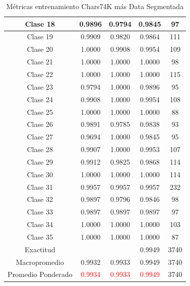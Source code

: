 \begin{table}[H]
\begin{center}
{\begin{tabular}{||c|c|c|c|c||}
Clase 18  &   0.9896 &   0.9794 &   0.9845  &   97\\\hline
Clase 19  &   0.9909 &   0.9820 &   0.9864  &   111\\\hline
Clase 20  &   1.0000 &   0.9908 &   0.9954  &   109\\\hline
Clase 21  &   1.0000 &   1.0000 &   1.0000  &   98\\\hline
Clase 22  &   1.0000 &   1.0000 &   1.0000  &   115\\\hline
Clase 23  &   0.9794 &  1.0000  &  0.9896   &   95\\\hline
Clase 24  &   0.9908 &   1.0000 &   0.9954  &   108\\\hline
Clase 25  &   1.0000 &   1.0000 &   1.0000  &   88\\\hline
Clase 26  &   0.9891 &   0.9785 &   0.9838  &   93\\\hline
Clase 27  &   0.9694 &   1.0000 &   0.9845  &   95\\\hline
Clase 28  &   0.9907 &   1.0000 &   0.9953  &   107\\\hline
Clase 29  &   0.9912 &   0.9825 &   0.9868  &   114\\\hline
Clase 30  &   1.0000 &   1.0000 &   1.0000  &   114\\\hline
Clase 31  &   0.9957 &   0.9957 &   0.9957  &   232\\\hline
Clase 32  &   0.9897 &   0.9796 &   0.9846  &   98\\\hline
Clase 33  &   0.9897 &   0.9897 &   0.9897  &   97\\\hline
Clase 34  &   1.0000 &   1.0000 &   1.0000  &   103\\\hline
Clase 35  &   1.0000 &   1.0000 &   1.0000  &   87\\\hline
\hline
Exactitud  &  &  & 0.9949  &   3740\\\hline
Macropromedio &   0.9932 &   0.9933 &   0.9949  &   3740\\\hline
Promedio Ponderado  & \textcolor{red}{0.9934} &   \textcolor{red}{0.9933} &  \textcolor{red}{ 0.9949}  &   3740\\\hline
\hline
\end{tabular}
}
\caption{\label{table:Metricas chars74k más data}Métricas entrenamiento Chars74K más Data Segmentada}
\end{center}
\end{table}




